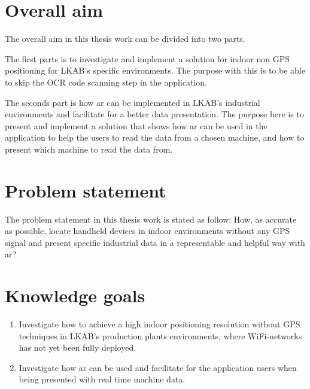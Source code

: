 \section{Overall aim}
The overall aim in this thesis work can be divided into two parts.

\bigskip

The first parts is to investigate and implement a solution for indoor non GPS positioning for LKAB's specific environments.
The purpose with this is to be able to skip the OCR code scanning step in the application.

\bigskip

The seconds part is how \acrfull{ar} can be implemented in LKAB's industrial environments and facilitate for a better data presentation.
The purpose here is to present and implement a solution that shows how \acrshort{ar} can be used in the application to help the users to read the data from a chosen machine, and how to present which machine to read the data from.


\section{Problem statement}
The problem statement in this thesis work is stated as follow:
How, as accurate as possible, locate handheld devices in indoor environments without any GPS signal and present specific industrial data in a representable and helpful way with \acrlong{ar}?

\section{Knowledge goals}
\begin{enumerate}
  \item \label{knowGoals:pos} Investigate how to achieve a high indoor positioning resolution without GPS techniques in LKAB's production plants environments, where WiFi-networks has not yet been fully deployed.

  \item \label{knowGoals:ar} Investigate how \acrshort{ar} can be used and facilitate for the application users when being presented with real time machine data.
\end{enumerate}

